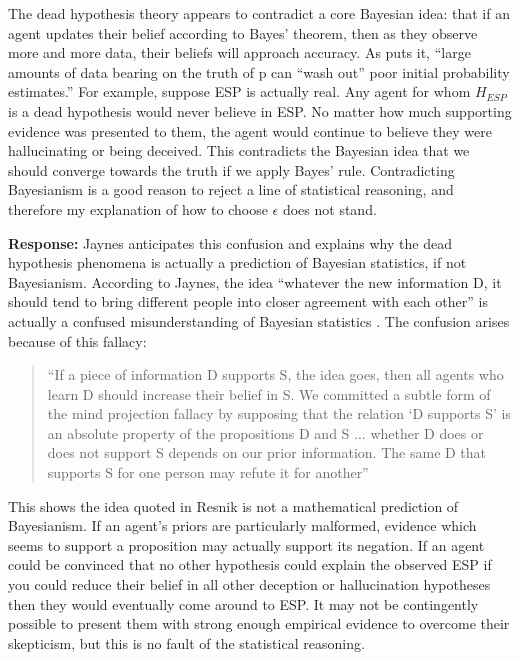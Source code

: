 \documentclass{article}
\begin{document}
The dead hypothesis theory appears to contradict a core Bayesian idea: that if an agent updates their belief according to Bayes' theorem, then as they observe more and more data, their beliefs will approach accuracy. As \citep[pg. 56]{resnik1987choices} puts it, ``large amounts of data bearing on the truth of p can ``wash out'' poor initial probability estimates.'' For example, suppose ESP is actually real. Any agent for whom \(H_{ESP}\) is a dead hypothesis would never believe in ESP. No matter how much supporting evidence was presented to them, the agent would continue to believe they were hallucinating or being deceived. This contradicts the Bayesian idea that we should converge towards the truth if we apply Bayes' rule. Contradicting Bayesianism is a good reason to reject a line of statistical reasoning, and therefore my explanation of how to choose \(\epsilon\) does not stand.

\textbf{Response:} Jaynes anticipates this confusion and explains why the dead hypothesis phenomena is actually a prediction of Bayesian statistics, if not Bayesianism. According to Jaynes, the idea ``whatever the new information D, it should tend to bring different people into closer agreement with each other'' is actually a confused misunderstanding of Bayesian statistics \citep[pg. 127]{jaynes2003probability}. The confusion arises because of this fallacy: 

\begin{quote}
``If a piece of information D supports S, the idea goes, then all agents who learn D should increase their belief in S. We committed a subtle form of the mind projection fallacy by supposing that the relation ‘D supports S’ is an absolute property of the propositions D and S ... whether D does or does not support S depends on our prior information. The same D that supports S for one person may refute it for another'' \citep[pg. 131]{jaynes2003probability}
\end{quote}

This shows the idea quoted in Resnik is not a mathematical prediction of Bayesianism. If an agent's priors are particularly malformed, evidence which seems to support a proposition may actually support its negation. If an agent could be convinced that no other hypothesis could explain the observed ESP \textemdash{} if you could reduce their belief in all other deception or hallucination hypotheses \textemdash{} then they would eventually come around to ESP. It may not be contingently possible to present them with strong enough empirical evidence to overcome their skepticism, but this is no fault of the statistical reasoning.
\end{document}
